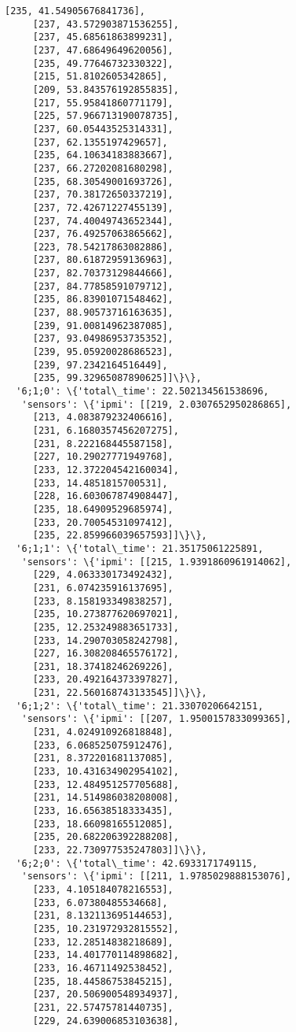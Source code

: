 \documentclass[11pt]{article}
\begin{document}
\begin{tcolorbox}[breakable, size=fbox, boxrule=.5pt, pad at break*=1mm, opacityfill=0]
\begin{Verbatim}[commandchars=\\\{\}]
     [235, 41.54905676841736],
     [237, 43.572903871536255],
     [237, 45.68561863899231],
     [237, 47.68649649620056],
     [235, 49.77646732330322],
     [215, 51.8102605342865],
     [209, 53.843576192855835],
     [217, 55.95841860771179],
     [225, 57.966713190078735],
     [237, 60.05443525314331],
     [237, 62.1355197429657],
     [235, 64.10634183883667],
     [237, 66.27202081680298],
     [235, 68.30549001693726],
     [237, 70.38172650337219],
     [237, 72.42671227455139],
     [237, 74.40049743652344],
     [237, 76.49257063865662],
     [223, 78.54217863082886],
     [237, 80.61872959136963],
     [237, 82.70373129844666],
     [237, 84.77858591079712],
     [235, 86.83901071548462],
     [237, 88.90573716163635],
     [239, 91.00814962387085],
     [237, 93.04986953735352],
     [239, 95.05920028686523],
     [239, 97.2342164516449],
     [235, 99.32965087890625]]\}\},
  '6;1;0': \{'total\_time': 22.502134561538696,
   'sensors': \{'ipmi': [[219, 2.0307652950286865],
     [213, 4.083879232406616],
     [231, 6.1680357456207275],
     [231, 8.222168445587158],
     [227, 10.29027771949768],
     [233, 12.372204542160034],
     [233, 14.4851815700531],
     [228, 16.603067874908447],
     [235, 18.64909529685974],
     [233, 20.70054531097412],
     [235, 22.859966039657593]]\}\},
  '6;1;1': \{'total\_time': 21.35175061225891,
   'sensors': \{'ipmi': [[215, 1.9391860961914062],
     [229, 4.063330173492432],
     [231, 6.074235916137695],
     [233, 8.158193349838257],
     [235, 10.273877620697021],
     [235, 12.253249883651733],
     [233, 14.290703058242798],
     [227, 16.308208465576172],
     [231, 18.37418246269226],
     [233, 20.492164373397827],
     [231, 22.560168743133545]]\}\},
  '6;1;2': \{'total\_time': 21.33070206642151,
   'sensors': \{'ipmi': [[207, 1.9500157833099365],
     [231, 4.024910926818848],
     [233, 6.068525075912476],
     [231, 8.372201681137085],
     [233, 10.431634902954102],
     [233, 12.484951257705688],
     [231, 14.514986038208008],
     [233, 16.65638518333435],
     [233, 18.66098165512085],
     [235, 20.682206392288208],
     [233, 22.730977535247803]]\}\},
  '6;2;0': \{'total\_time': 42.6933171749115,
   'sensors': \{'ipmi': [[211, 1.9785029888153076],
     [233, 4.105184078216553],
     [233, 6.07380485534668],
     [231, 8.132113695144653],
     [235, 10.231972932815552],
     [233, 12.28514838218689],
     [233, 14.401770114898682],
     [233, 16.46711492538452],
     [235, 18.44586753845215],
     [237, 20.506900548934937],
     [231, 22.57475781440735],
     [229, 24.639006853103638],

\end{Verbatim}
\end{tcolorbox}
\end{document}
